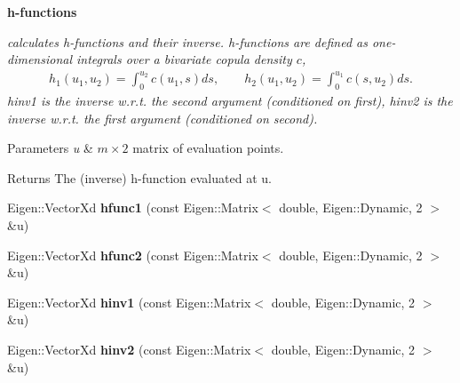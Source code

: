 \begin{Indent}{\bf h-\/functions}\par
{\em calculates h-\/functions and their inverse. h-\/functions are defined as one-\/dimensional integrals over a bivariate copula density $ c $, \begin{align*} h_1(u_1, u_2) = \int_0^{u_2} c(u_1, s) ds, \qquad h_2(u_1, u_2) = \int_0^{u_1} c(s, u_2) ds. \end{align*} {\ttfamily hinv1} is the inverse w.\+r.\+t. the second argument (conditioned on first), {\ttfamily hinv2} is the inverse w.\+r.\+t. the first argument (conditioned on second).


\begin{DoxyParams}{Parameters}
{\em u} & $m \times 2$ matrix of evaluation points. \\
\hline
\end{DoxyParams}
\begin{DoxyReturn}{Returns}
The (inverse) h-\/function evaluated at {\ttfamily u}. 
\end{DoxyReturn}
}\begin{DoxyCompactItemize}
\item 
Eigen\+::\+Vector\+Xd {\bfseries hfunc1} (const Eigen\+::\+Matrix$<$ double, Eigen\+::\+Dynamic, 2 $>$ \&u)\hypertarget{classvinecopulib_1_1_bicop_a130fda62cd61c7acdef5db75fffdd89e}{}\label{classvinecopulib_1_1_bicop_a130fda62cd61c7acdef5db75fffdd89e}

\item 
Eigen\+::\+Vector\+Xd {\bfseries hfunc2} (const Eigen\+::\+Matrix$<$ double, Eigen\+::\+Dynamic, 2 $>$ \&u)\hypertarget{classvinecopulib_1_1_bicop_a4c9b50f99797ec374f5057cc54db2bd8}{}\label{classvinecopulib_1_1_bicop_a4c9b50f99797ec374f5057cc54db2bd8}

\item 
Eigen\+::\+Vector\+Xd {\bfseries hinv1} (const Eigen\+::\+Matrix$<$ double, Eigen\+::\+Dynamic, 2 $>$ \&u)\hypertarget{classvinecopulib_1_1_bicop_a3cc8b161ec6efdb3b34d2efa9185bf44}{}\label{classvinecopulib_1_1_bicop_a3cc8b161ec6efdb3b34d2efa9185bf44}

\item 
Eigen\+::\+Vector\+Xd {\bfseries hinv2} (const Eigen\+::\+Matrix$<$ double, Eigen\+::\+Dynamic, 2 $>$ \&u)\hypertarget{classvinecopulib_1_1_bicop_a3e33ec227b6b7182e327399201cad382}{}\label{classvinecopulib_1_1_bicop_a3e33ec227b6b7182e327399201cad382}

\end{DoxyCompactItemize}
\end{Indent}
